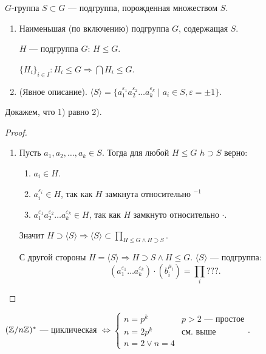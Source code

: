  \begin{definition}
     $G$-группа  $S \subset G$ --- подгруппа, порожденная множеством  $S$.
    \begin{enumerate}
        \item Наименьшая (по включению) подгруппа $G$, содержащая  $S$.
        \begin{remark}
            $H$ --- подгруппа  $G$:  $H \le G$.
        \end{remark}
        \begin{remark}
            $\{H_i\}_{i \in I}: H_i \le G \Rightarrow \bigcap H_i \le G$.
        \end{remark}
    \item (Явное описание). $\langle S \rangle  = \{a_1^{\varepsilon_1}a_2^{\varepsilon_2}\ldots a_k^{\varepsilon_k} \mid a_i \in S, \varepsilon = \pm 1\}$.
    \end{enumerate}
 \end{definition}
 \slashn Докажем, что 1) равно 2). 
 \begin{proof}
     \slashn
     \begin{enumerate}
         \item Пусть $a_1, a_2, \ldots, a_k \in S$. Тогда для любой $H \le G$ $h \supset S$ верно:
              \begin{enumerate}
                  \item $a_i \in H$.
                  \item  $a_i^{\varepsilon_i} \in H$, так как  $H$ замкнута относительно $^{-1}$
                  \item  $a_1^{\varepsilon_1} a_2^{\varepsilon_2} \ldots a_k^{\varepsilon_k} \in H$, так как $H$ замкнуто относительно  $\cdot$.
             \end{enumerate}

             Значит $H \supset \langle S \rangle \Rightarrow \langle S \rangle \subset \prod_{H \le G \land H \supset S}$.
        
             С другой стороны $H = \langle S \rangle \Rightarrow H \supset S \land H \le G$. $\langle S \rangle$ --- подгруппа:  \[
                 (a_1^{\varepsilon_1} \ldots a_k^{\varepsilon_k}) \cdot (b_i ^ {\mu_i}) = \prod_i ??? 
             .\] 
     \end{enumerate}

 \end{proof}

  \begin{theorem}
      $(\mathbb{Z} / n\mathbb{Z})^*$ --- циклическая  $\iff \begin{cases} n=p^k & p>2\text{ --- простое} \\ n = 2 p^k & \text{см. выше} \\ n = 2 \lor n = 4\end{cases}$.
 \end{theorem}
 \slashn

